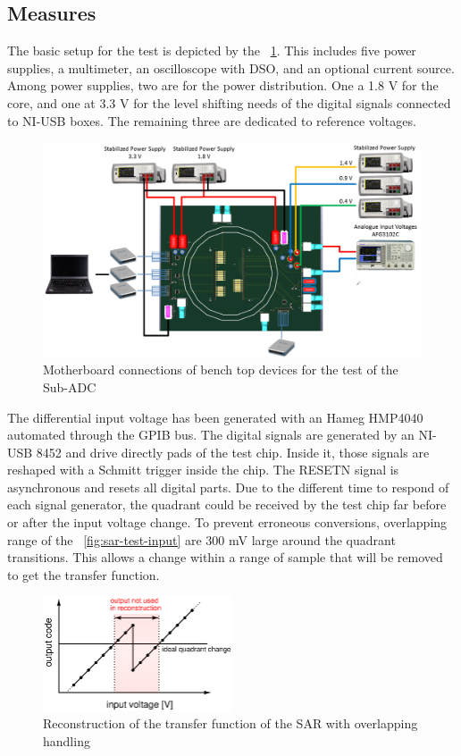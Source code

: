 \subsection{Measures}
The basic setup for the test is depicted by the \figurename~\ref{fig:sar-test-connections}. This includes five power supplies, a multimeter, an oscilloscope with DSO, and an optional current source. Among power supplies, two are for the power distribution. One a 1.8 V for the core, and one at 3.3 V for the level shifting needs of the digital signals connected to NI-USB boxes. The remaining three are dedicated to reference voltages.

\begin{figure}[htp]
    \centering
    \includegraphics[width=.8\textwidth]{Chapter5/Figs/sar_test/board_test_setup.png}
    \caption{Motherboard connections of bench top devices for the test of the Sub-ADC}
    \label{fig:sar-test-connections}
\end{figure}

The differential input voltage has been generated with an Hameg HMP4040 automated through the GPIB bus. The digital signals are generated by an NI-USB 8452 and drive directly pads of the test chip. Inside it, those signals are reshaped with a Schmitt trigger inside the chip. The RESETN signal is asynchronous and resets all digital parts. Due to the different time to respond of each signal generator, the quadrant could be received by the test chip far before or after the input voltage change. To prevent erroneous conversions, overlapping range of the \figurename~\ref{fig:sar-test-input} are 300 mV large around the quadrant transitions. This allows a change within a range of sample that will be removed to get the transfer function.

\begin{figure}[htp]
    \centering
    \includegraphics[width=0.5\textwidth]{Chapter5/Figs/sar_test/sar-tf-overlapp.ps}
    \caption{Reconstruction of the transfer function of the SAR with overlapping handling}
    \label{fig:sar-tf-overlap}
\end{figure}

